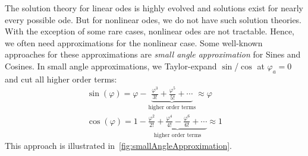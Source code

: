 	The solution theory for linear \acp{ode} is highly evolved and solutions exist for nearly every possible \ac{ode}. But for nonlinear \acp{ode}, we do not have such solution theories. With the exception of some rare cases, nonlinear \acp{ode} are not tractable. Hence, we often need approximations for the nonlinear case. Some well-known approaches for these approximations are \eg \emph{small angle approximation} for Sines and Cosines. In small angle approximations, we Taylor-expand \( \sin \)/\( \cos \) at \( \varphi_a = 0 \) and cut all higher order terms:
	\begin{gather*}
		\sin(\varphi) = \varphi - \underbrace{\frac{\varphi^3}{3!} + \frac{\varphi^5}{5!} + \cdots}_\text{higher order terms} \approx \varphi \\
		\cos(\varphi) = 1 - \underbrace{\frac{\varphi^2}{2!} + \frac{\varphi^4}{4!} - \frac{\varphi^6}{6!} + \cdots}_\text{higher order terms} \approx 1
	\end{gather*}
	This approach is illustrated in~\autoref{fig:smallAngleApproximation}.

